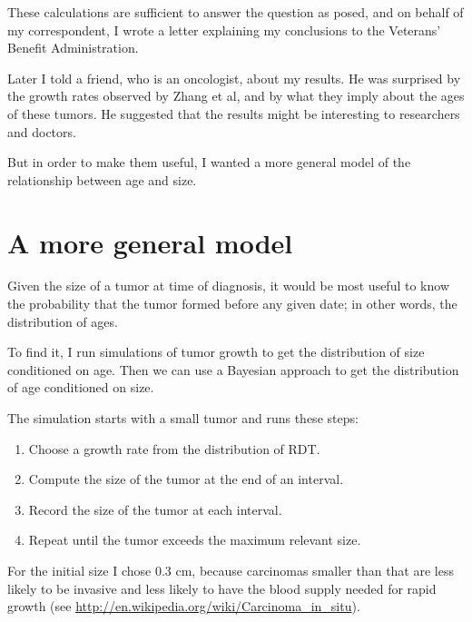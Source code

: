 \documentclass[12pt]{book}
\theoremstyle{exercise}
\begin{document}
These calculations are sufficient to answer the question as
posed, and on behalf of my correspondent, I wrote a letter explaining
my conclusions to the Veterans' Benefit Administration.

Later I told a friend, who is an oncologist, about my results.  He was
surprised by the growth rates observed by Zhang et al, and by what
they imply about the ages of these tumors.  He suggested that the
results might be interesting to researchers and doctors.

But in order to make them useful, I wanted a more general model
of the relationship between age and size.


\section{A more general model}

Given the size of a tumor at time of diagnosis, it would be most
useful to know the probability that the tumor formed before
any given date; in other words, the distribution of ages.

To find it, I run simulations of tumor growth to get the
distribution of size conditioned on age.  Then we can use
a Bayesian approach to get the
distribution of age conditioned on size.

The simulation starts with a small tumor and runs these steps:

\begin{enumerate}

\item Choose a growth rate from the distribution of RDT.

\item Compute the size of the tumor at the end of an interval.

\item Record the size of the tumor at each interval.

\item Repeat until the tumor exceeds the maximum relevant size.

\end{enumerate}

For the initial size I chose 0.3 cm, because carcinomas smaller than
that are less likely to be invasive and less likely to have the blood
supply needed for rapid growth (see
\url{http://en.wikipedia.org/wiki/Carcinoma_in_situ}).
\end{document}
